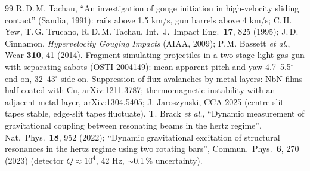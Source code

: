 \begin{thebibliography}{99}
 R.\,D.\,M. Tachau, ``An investigation of gouge initiation in high-velocity sliding contact'' (Sandia, 1991): rails above 1.5 km/s, gun barrels above 4 km/s; C.\,H. Yew, T.\,G. Trucano, R.\,D.\,M. Tachau, Int.\ J.\ Impact Eng.\ \textbf{17}, 825 (1995); J.\,D. Cinnamon, \emph{Hypervelocity Gouging Impacts} (AIAA, 2009); P.\,M. Bassett \emph{et al.}, Wear \textbf{310}, 41 (2014).
 Fragment-simulating projectiles in a two-stage light-gas gun with separating sabots (OSTI 2004149): mean apparent pitch and yaw 4.7--5.5$^\circ$ end-on, 32--43$^\circ$ side-on.
 Suppression of flux avalanches by metal layers: NbN films half-coated with Cu, arXiv:1211.3787; thermomagnetic instability with an adjacent metal layer, arXiv:1304.5405; J. Jaroszynski, CCA 2025 (centre-slit tapes stable, edge-slit tapes fluctuate).
 T. Brack \emph{et al.}, ``Dynamic measurement of gravitational coupling between resonating beams in the hertz regime'', Nat.\ Phys.\ \textbf{18}, 952 (2022); ``Dynamic gravitational excitation of structural resonances in the hertz regime using two rotating bars'', Commun.\ Phys.\ \textbf{6}, 270 (2023) (detector $Q\approx10^4$, 42 Hz, $\sim$0.1\,\% uncertainty).
\end{thebibliography}
